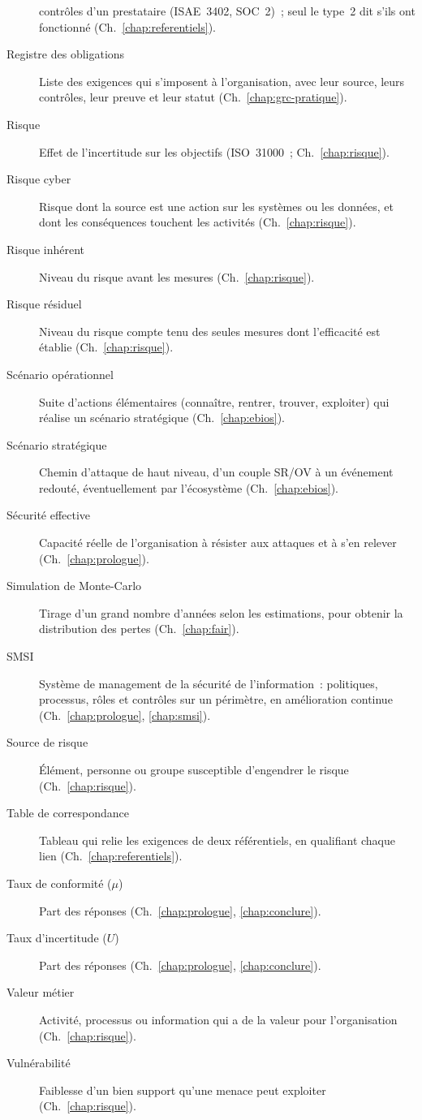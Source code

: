 \begin{description}
          contrôles d'un prestataire (ISAE~3402, SOC~2)~; seul le type~2 dit
          s'ils ont fonctionné (Ch.~\ref{chap:referentiels}).
    \item[Registre des obligations] Liste des exigences qui s'imposent à
          l'organisation, avec leur source, leurs contrôles, leur preuve et
          leur statut (Ch.~\ref{chap:grc-pratique}).
    \item[Risque] Effet de l'incertitude sur les objectifs (ISO~31000~;
          Ch.~\ref{chap:risque}).
    \item[Risque cyber] Risque dont la source est une action sur les
          systèmes ou les données, et dont les conséquences touchent les
          activités (Ch.~\ref{chap:risque}).
    \item[Risque inhérent] Niveau du risque avant les mesures
          (Ch.~\ref{chap:risque}).
    \item[Risque résiduel] Niveau du risque compte tenu des seules mesures
          dont l'efficacité est établie (Ch.~\ref{chap:risque}).
    \item[Scénario opérationnel] Suite d'actions élémentaires (connaître,
          rentrer, trouver, exploiter) qui réalise un scénario stratégique
          (Ch.~\ref{chap:ebios}).
    \item[Scénario stratégique] Chemin d'attaque de haut niveau, d'un couple
          SR/OV à un événement redouté, éventuellement par l'écosystème
          (Ch.~\ref{chap:ebios}).
    \item[Sécurité effective] Capacité réelle de l'organisation à résister
          aux attaques et à s'en relever (Ch.~\ref{chap:prologue}).
    \item[Simulation de Monte-Carlo] Tirage d'un grand nombre d'années selon
          les estimations, pour obtenir la distribution des pertes
          (Ch.~\ref{chap:fair}).
    \item[SMSI] Système de management de la sécurité de l'information~:
          politiques, processus, rôles et contrôles sur un périmètre, en
          amélioration continue (Ch.~\ref{chap:prologue}, \ref{chap:smsi}).
    \item[Source de risque] Élément, personne ou groupe susceptible
          d'engendrer le risque (Ch.~\ref{chap:risque}).
    \item[Table de correspondance] Tableau qui relie les exigences de deux
          référentiels, en qualifiant chaque lien (Ch.~\ref{chap:referentiels}).
    \item[Taux de conformité ($\mu$)] Part des réponses \OUI{}
          (Ch.~\ref{chap:prologue}, \ref{chap:conclure}).
    \item[Taux d'incertitude ($U$)] Part des réponses \NEK{}
          (Ch.~\ref{chap:prologue}, \ref{chap:conclure}).
    \item[Valeur métier] Activité, processus ou information qui a de la
          valeur pour l'organisation (Ch.~\ref{chap:risque}).
    \item[Vulnérabilité] Faiblesse d'un bien support qu'une menace peut
          exploiter (Ch.~\ref{chap:risque}).
\end{description}
